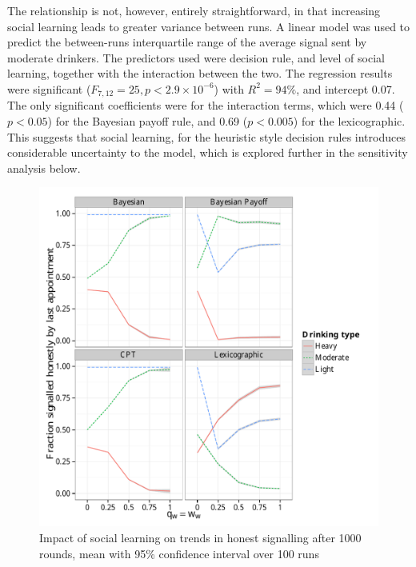 The relationship is not, however, entirely straightforward, in that increasing social learning leads to greater variance between runs. A linear model was used to predict the between-runs interquartile range of the average signal sent by moderate drinkers. The predictors used were decision rule, and level of social learning, together with the interaction between the two. The regression results were significant (\(F_{7,12}=25,p<2.9\times10^{-6}\)) with \(R^2=94\%\), and intercept 0.07. The only significant coefficients were for the interaction terms, which were 0.44 (\(p<0.05\)) for the Bayesian payoff rule, and 0.69 (\(p<0.005\)) for the lexicographic. This suggests that social learning, for the heuristic style decision rules introduces considerable uncertainty to the model, which is explored further in the sensitivity analysis below.

\begin{figure}[H]
\begin{adjustbox}{center}
\includegraphics[width=119mm]{figures/honesty_sharing}
\end{adjustbox}
\caption{Impact of social learning on trends in honest signalling after 1000 rounds, mean with 95\% confidence interval over 100 runs}
\label{fig:honest_sharing}
\end{figure}

